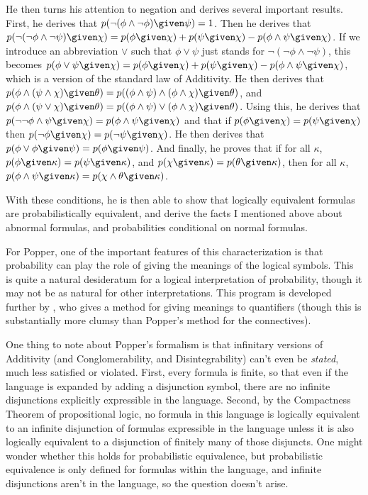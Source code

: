 He then turns his attention to negation and derives several important results. First, he derives that $p(\lnot(\phi\land \lnot \phi) \given \psi)=1$. Then he derives that $p(\lnot(\lnot \phi\land\lnot \psi) \given \chi)=p(\phi \given \chi)+p(\psi \given \chi)-p(\phi\land \psi \given \chi)$. If we introduce an abbreviation $\lor$ such that $\phi\lor \psi$ just stands for $\lnot(\lnot \phi\land\lnot \psi)$, this becomes $p(\phi\lor \psi \given \chi)=p(\phi \given \chi)+p(\psi \given \chi)-p(\phi\land \psi \given \chi)$, which is a version of the standard law of Additivity. He then derives that $p(\phi\land(\psi\land \chi) \given \theta)=p((\phi\land \psi)\land(\phi\land \chi) \given \theta)$, and $p(\phi\land(\psi\lor \chi) \given \theta)=p((\phi\land \psi)\lor(\phi\land \chi) \given \theta)$. Using this, he derives that $p(\lnot\lnot \phi\land \psi \given \chi)=p(\phi\land \psi \given \chi)$ and that if $p(\phi \given \chi)=p(\psi \given \chi)$ then $p(\lnot \phi \given \chi)=p(\lnot \psi \given \chi)$. He then derives that $p(\phi\lor \phi \given \psi)=p(\phi \given \psi)$. And finally, he proves that if for all $\kappa$, $p(\phi \given \kappa)=p(\psi \given \kappa)$, and $p(\chi \given \kappa)=p(\theta \given \kappa)$, then for all $\kappa$, $p(\phi\land \psi \given \kappa)=p(\chi\land \theta \given \kappa)$.

With these conditions, he is then able to show that logically equivalent formulas are probabilistically equivalent, and derive the facts I mentioned above about abnormal formulas, and probabilities conditional on normal formulas.

For Popper, one of the important features of this characterization is that probability can play the role of giving the meanings of the logical symbols. This is quite a natural desideratum for a logical interpretation of probability, though it may not be as natural for other interpretations. This program is developed further by \citet{lmcr}, who gives a method for giving meanings to quantifiers (though this is substantially more clumsy than Popper's method for the connectives).

One thing to note about Popper's formalism is that infinitary versions of Additivity (and Conglomerability, and Disintegrability) can't even be \emph{stated}, much less satisfied or violated. First, every formula is finite, so that even if the language is expanded by adding a disjunction symbol, there are no infinite disjunctions explicitly expressible in the language. Second, by the Compactness Theorem of propositional logic, no formula in this language is logically equivalent to an infinite disjunction of formulas expressible in the language unless it is also logically equivalent to a disjunction of finitely many of those disjuncts. One might wonder whether this holds for probabilistic equivalence, but probabilistic equivalence is only defined for formulas within the language, and infinite disjunctions aren't in the language, so the question doesn't arise.

